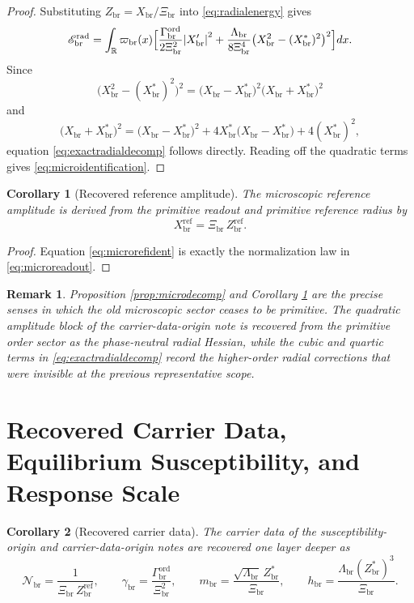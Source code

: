 \documentclass[11pt]{article}
\newcommand{\ProfWeight}{\varpi_{\mathrm{br}}}
\newcommand{\RespNorm}{\mathcal N_{\mathrm{br}}}
\newcommand{\RespFluxCoeff}{\gamma_{\mathrm{br}}}
\newcommand{\RespGap}{m_{\mathrm{br}}}
\newcommand{\RespBias}{h_{\mathrm{br}}}
\newcommand{\RespMicro}{X_{\mathrm{br}}}
\newcommand{\RespMicroEq}{X_{\mathrm{br}}^{\ast}}
\newcommand{\RespMicroRef}{X_{\mathrm{br}}^{\mathrm{ref}}}
\newcommand{\RespOrderAmp}{Z_{\mathrm{br}}}
\newcommand{\RespOrderRef}{Z_{\mathrm{br}}^{\mathrm{ref}}}
\newcommand{\RespOrderEq}{Z_{\mathrm{br}}^{\ast}}
\newcommand{\RespOrderReadout}{\Xi_{\mathrm{br}}}
\newcommand{\RespOrderStiff}{\Gamma_{\mathrm{br}}^{\mathrm{ord}}}
\newcommand{\RespOrderQuartic}{\Lambda_{\mathrm{br}}}
\newcommand{\RespOrderRadEnergy}{\mathscr E_{\mathrm{br}}^{\mathrm{rad}}}
\newtheorem{remark}{Remark}
\newtheorem{corollary}{Corollary}
\begin{document}
\begin{proof}
Substituting \(\RespOrderAmp=\RespMicro/\RespOrderReadout\) into \eqref{eq:radialenergy} gives
\[
\RespOrderRadEnergy
=
\int_{\mathbb R}\ProfWeight(x)\Bigl[
\frac{\RespOrderStiff}{2\RespOrderReadout^2}\abs{\RespMicro'}^2
+
\frac{\RespOrderQuartic}{8\RespOrderReadout^4}
\bigl(\RespMicro^2-(\RespMicroEq)^2\bigr)^2
\Bigr]dx.
\]
Since
\[
\bigl(\RespMicro^2-(\RespMicroEq)^2\bigr)^2
=
\bigl(\RespMicro-\RespMicroEq\bigr)^2\bigl(\RespMicro+\RespMicroEq\bigr)^2
\]
and
\[
\bigl(\RespMicro+\RespMicroEq\bigr)^2
=
\bigl(\RespMicro-\RespMicroEq\bigr)^2
+4\RespMicroEq\bigl(\RespMicro-\RespMicroEq\bigr)
+4(\RespMicroEq)^2,
\]
equation \eqref{eq:exactradialdecomp} follows directly. Reading off the quadratic terms gives \eqref{eq:microidentification}.
\end{proof}

\begin{corollary}[Recovered reference amplitude]
\label{cor:microref}
The microscopic reference amplitude is derived from the primitive readout and primitive reference radius by
\begin{equation}
\RespMicroRef=\RespOrderReadout\,\RespOrderRef.
\label{eq:microrefident}
\end{equation}
\end{corollary}

\begin{proof}
Equation \eqref{eq:microrefident} is exactly the normalization law in \eqref{eq:microreadout}.
\end{proof}

\begin{remark}
Proposition \ref{prop:microdecomp} and Corollary \ref{cor:microref} are the precise senses in which the old microscopic sector ceases to be primitive. The quadratic amplitude block of the carrier-data-origin note is recovered from the primitive order sector as the phase-neutral radial Hessian, while the cubic and quartic terms in \eqref{eq:exactradialdecomp} record the higher-order radial corrections that were invisible at the previous representative scope.
\end{remark}

\section{Recovered Carrier Data, Equilibrium Susceptibility, and Response Scale}

\begin{corollary}[Recovered carrier data]
\label{cor:carrierdata}
The carrier data of the susceptibility-origin and carrier-data-origin notes are recovered one layer deeper as
\begin{equation}
\RespNorm=\frac{1}{\RespOrderReadout\,\RespOrderRef},
\qquad
\RespFluxCoeff=\frac{\RespOrderStiff}{\RespOrderReadout^2},
\qquad
\RespGap=\frac{\sqrt{\RespOrderQuartic}\,\RespOrderEq}{\RespOrderReadout},
\qquad
\RespBias=\frac{\RespOrderQuartic(\RespOrderEq)^3}{\RespOrderReadout}.
\label{eq:carrierfromorder}
\end{equation}
\end{corollary}
\end{document}
